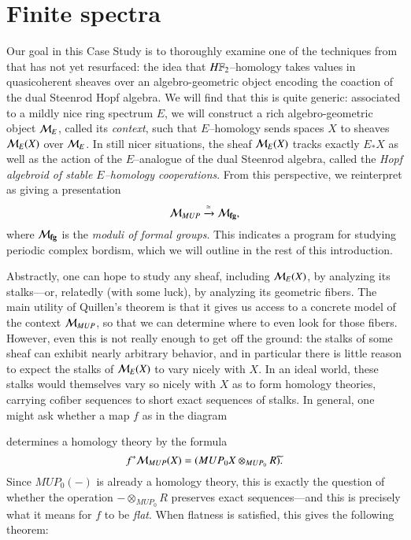 
\chapter{Finite spectra}\label{ChapterFiniteSpectra}



Our goal in this Case Study is to thoroughly examine one of the techniques from  that has not yet resurfaced: the idea that $\HFtwo$--homology takes values in quasicoherent sheaves over an algebro-geometric object encoding the coaction of the dual Steenrod Hopf algebra.  We will find that this is quite generic: associated to a mildly nice ring spectrum $E$, we will construct a rich algebro-geometric object $\mathcal{M}_{E}$, called its \textit{context}, such that $E$--homology sends spaces $X$ to sheaves $\mathcal{M}_{E}(X)$ over $\mathcal{M}_{E}$.  In still nicer situations, the sheaf $\mathcal{M}_{E}(X)$ tracks exactly $E_* X$ as well as the action of the $E$--analogue of the dual Steenrod algebra, called the \textit{Hopf algebroid of stable $E$--homology cooperations}.  From this perspective, we reinterpret  as giving a presentation \[\mathcal{M}_{MUP} \xrightarrow{\simeq} \mathcal{M}_{\mathbf{fg}},\] where $\mathcal{M}_{\mathbf{fg}}$ is the \textit{moduli of formal groups}.  This indicates a program for studying periodic complex bordism, which we will outline in the rest of this introduction.

Abstractly, one can hope to study any sheaf, including $\mathcal{M}_{E}(X)$, by analyzing its stalks---or, relatedly (with some luck), by analyzing its geometric fibers.  The main utility of Quillen's theorem is that it gives us access to a concrete model of the context $\mathcal{M}_{MUP}$, so that we can determine where to even look for those fibers.  However, even this is not really enough to get off the ground: the stalks of some sheaf can exhibit nearly arbitrary behavior, and in particular there is little reason to expect the stalks of $\mathcal{M}_{E}(X)$ to vary nicely with $X$.  In an ideal world, these stalks would themselves vary so nicely with $X$ as to form homology theories, carrying cofiber sequences to short exact sequences of stalks.  In general, one might ask whether a map $f$ as in the diagram
\begin{center}
\end{center}
determines a homology theory by the formula \[f^* \mathcal{M}_{MUP}(X) = (MUP_0 X \otimes_{MUP_0} R)\widetilde{}.\]  Since $MUP_0(-)$ is already a homology theory, this is exactly the question of whether the operation $- \otimes_{MUP_0} R$ preserves exact sequences---and this is precisely what it means for $f$ to be \textit{flat}.  When flatness is satisfied, this gives the following theorem:

